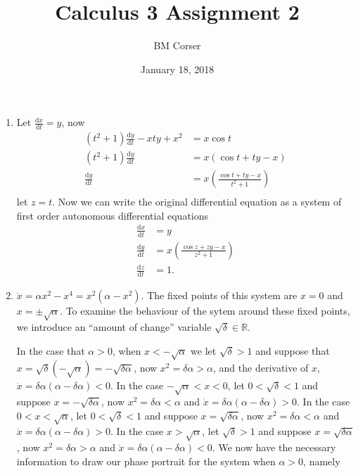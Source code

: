 \documentclass[10pt]{article}
\author{BM Corser}
\title{Calculus 3 Assignment 2}
\date{January 18, 2018}
\newcommand*{\dxdt}[1]{\frac{\text{d}#1}{\text{d}t}}
\begin{document}
  \maketitle
  \begin{enumerate}
    \item Let $\dxdt{x} = y$, now
      \begin{align*}
        (t^2+1)\dxdt{y} - xty + x^2 &= x\cos t \\
        (t^2+1)\dxdt{y} &= x(\cos t + ty - x) \\
        \dxdt{y} &= x\left(\frac{\cos t + ty - x}{t^2+1}\right) \\
      \end{align*}
      let $z = t$. Now we can write the original differential equation as a
      system of first order autonomous differential equations
      \begin{align*}
        \dxdt{x} &= y \\
        \dxdt{y} &= x\left(\frac{\cos z + zy - x}{z^2+1}\right) \\
        \dxdt{z} &= 1.
      \end{align*}
      \pagebreak
    \item $\dot x = \alpha x^2 - x^4 = x^2(\alpha - x^2)$. The fixed points of
      this system are $x = 0$ and $x = \pm \sqrt{\alpha}$. To examine the
      behaviour of the sytem around these fixed points, we introduce an
      ``amount of change'' variable $\sqrt{\delta} \in \mathbb{R}$.

      In the case that $\alpha > 0$, when $x < -\sqrt{\alpha}$ we let
      $\sqrt{\delta} > 1$ and suppose that
      $x = \sqrt{\delta}(-\sqrt{\alpha}) = -\sqrt{\delta\alpha}$, now
      $x^2 = \delta\alpha > \alpha$, and the derivative of $x$,
      $\dot x = \delta\alpha(\alpha - \delta\alpha) < 0$.
      In the case $-\sqrt{\alpha} < x < 0$,
      let $0 < \sqrt{\delta} < 1$ and suppose $x = -\sqrt{\delta\alpha}$,
      now $x^2 = \delta\alpha < \alpha$ and
      $\dot x = \delta\alpha(\alpha-\delta\alpha) > 0$.
      In the case $0 < x < \sqrt{\alpha}$,
      let $0 < \sqrt{\delta} < 1$ and suppose $x = \sqrt{\delta\alpha}$,
      now $x^2 = \delta\alpha < \alpha$ and
      $\dot x = \delta\alpha(\alpha-\delta\alpha) > 0$.
      In the case $x > \sqrt{\alpha}$,
      let $\sqrt{\delta} > 1$ and suppose $x = \sqrt{\delta\alpha}$,
      now $x^2 = \delta\alpha > \alpha$ and
      $\dot x = \delta\alpha(\alpha-\delta\alpha) < 0$. We now have the
      necessary information to draw our phase portrait for the system when
      $\alpha > 0$, namely


\end{enumerate}
\end{document}
